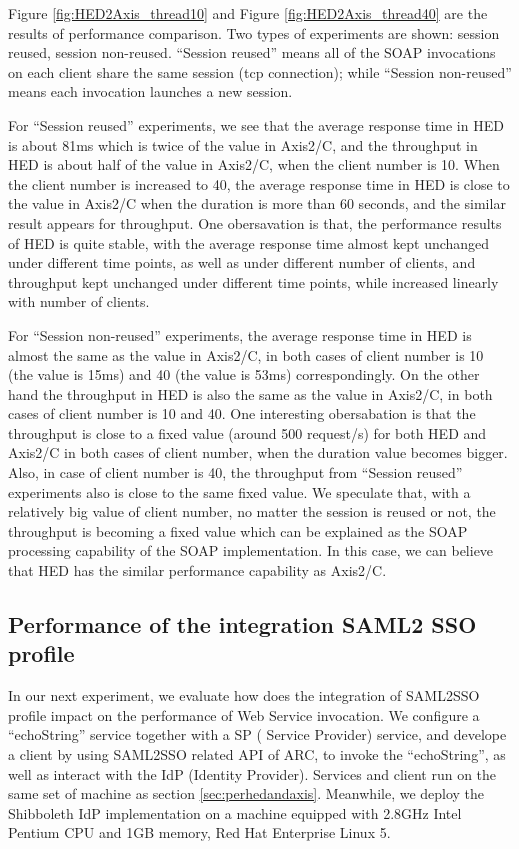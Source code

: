 \documentclass[conference]{IEEEtran}
\begin{document}
Figure \ref{fig:HED2Axis_thread10} and Figure \ref{fig:HED2Axis_thread40} are the results of 
performance comparison. 
Two types of experiments are shown: session reused, session non-reused.
``Session reused'' means all of the SOAP invocations on each client share the same session 
(tcp connection); while ``Session non-reused'' means each invocation launches a new session.

For ``Session reused'' experiments, we see that the average response time in HED is about 81ms
which is twice of the value in Axis2/C, and the throughput in HED is about half of the value in Axis2/C, 
when the client number is 10. When the client number is increased to 40, the average response 
time in HED is close to the value in Axis2/C when the duration is more than 60 seconds, and the 
similar result appears for throughput. One obersavation is that, the performance results of HED is 
quite stable, with the average response time almost kept unchanged under different time points, 
as well as under different number of clients, and throughput kept unchanged under different 
time points, while increased linearly with number of clients.

For ``Session non-reused'' experiments, the average response time in HED is almost the same as
the value in Axis2/C, in both cases of client number is 10 (the value is 15ms) and 40 (the value
 is 53ms) correspondingly. On the other hand the throughput in HED is also the same as the value 
in Axis2/C, in both cases of client number is 10 and 40. One interesting obersabation is that the 
throughput is close to a fixed value (around 500 request/s) for both HED and Axis2/C in both 
cases of client number, when the duration value becomes bigger. Also, in case of client number is
40, the throughput from ``Session reused'' experiments also is close to the same fixed value.
We speculate that, with a relatively big value of client number, no matter the session is reused or
not, the throughput is becoming a fixed value which can be explained as the SOAP processing capability
of the SOAP implementation. In this case, we can believe that HED has the similar performance 
capability as Axis2/C. 

\subsection{Performance of the integration SAML2 SSO profile}
\label{sec:perfsaml2sso}
In our next experiment, we evaluate how does the integration of SAML2SSO profile impact on the 
performance of Web Service invocation. We configure a ``echoString'' service together with a SP (
Service Provider) service, and develope a client by using SAML2SSO related API of ARC, to invoke 
the ``echoString'', as well as interact with the IdP (Identity Provider). Services and client run on
the same set of machine as section \ref{sec:perhedandaxis}. Meanwhile, we deploy the Shibboleth IdP 
implementation on a machine equipped with 2.8GHz Intel Pentium CPU and 1GB memory, Red Hat Enterprise 
Linux 5.
\end{document}
